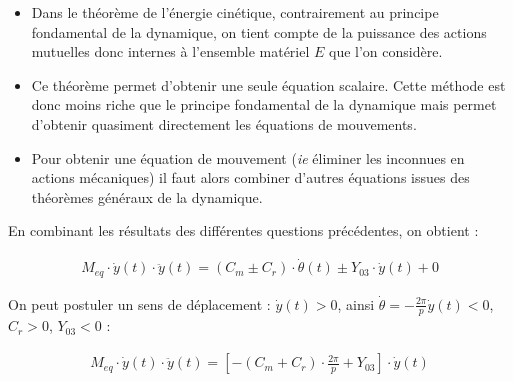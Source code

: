 \documentclass[a4paper,10pt]{article}
\begin{document}
\begin{remarque}
\begin{itemize}
\item Dans le théorème de l'énergie cinétique, contrairement au principe fondamental de la dynamique, on tient compte de la puissance des actions mutuelles donc internes à l'ensemble matériel $E$ que l'on considère.
\item Ce théorème permet d'obtenir une seule équation scalaire. Cette méthode est donc moins riche que le principe fondamental de la dynamique mais permet d'obtenir quasiment directement les équations de mouvements.
\item Pour obtenir une équation de mouvement (\textit{ie} éliminer les inconnues en actions mécaniques) il faut alors combiner d'autres équations issues des théorèmes généraux de la dynamique.
\end{itemize}
\end{remarque}

\begin{exemple}

\begin{texteCache}
En combinant les résultats des différentes questions précédentes, on obtient : 

\begin{align*}
M_{eq}\cdot \dot{y}(t)\cdot \ddot{y}(t)=\left(C_m\pm C_r\right)\cdot \dot{\theta}(t)\pm Y_{03}\cdot \dot{y}(t)+0
\end{align*}

On peut postuler un sens de déplacement : $\dot{y}(t)>0$, ainsi $\dot{\theta}=-\frac{2\pi}{p}\dot{y}(t)<0$,  $C_r>0$, $Y_{03}<0$ : 

\begin{align*}
M_{eq}\cdot \dot{y}(t)\cdot \ddot{y}(t)=\left[-\left(C_m+ C_r\right)\cdot \frac{2\pi}{p}+ Y_{03}\right]\cdot \dot{y}(t)
\end{align*}
\end{texteCache}
\end{exemple}
\end{document}
